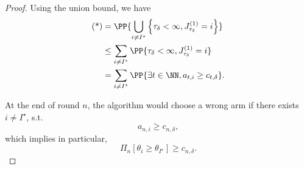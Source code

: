 \begin{proof}
Using the union bound, we have
\begin{align*}
\begin{split}
    \text{(*)} &= \PP{\bigcup_{i\neq I^\star} \left\{ \tau_{\delta} < \infty, J_{\tau_{\delta}}^{(1)} = i \right\}} \\
                  &\leq \sum_{i\neq I^\star} \PP{\tau_{\delta} < \infty, J_{\tau_{\delta}}^{(1)} = i} \\
                  &= \sum_{i\neq I^\star} \PP{\exists t \in \NN, a_{t,i} \geq c_{t,\delta}}.
\end{split}
\end{align*}




At the end of round $n$, the algorithm would choose a wrong arm if there exists $i\neq I^\star$, s.t.
\[
	a_{n,i} \geq c_{n,\delta},
\]
which implies in particular,
\begin{equation}\label{eq:error}
	\Pi_{n}\left[\theta_i \geq \theta_{I^\star} \right] \geq c_{n,\delta}.
\end{equation}


\end{proof}
